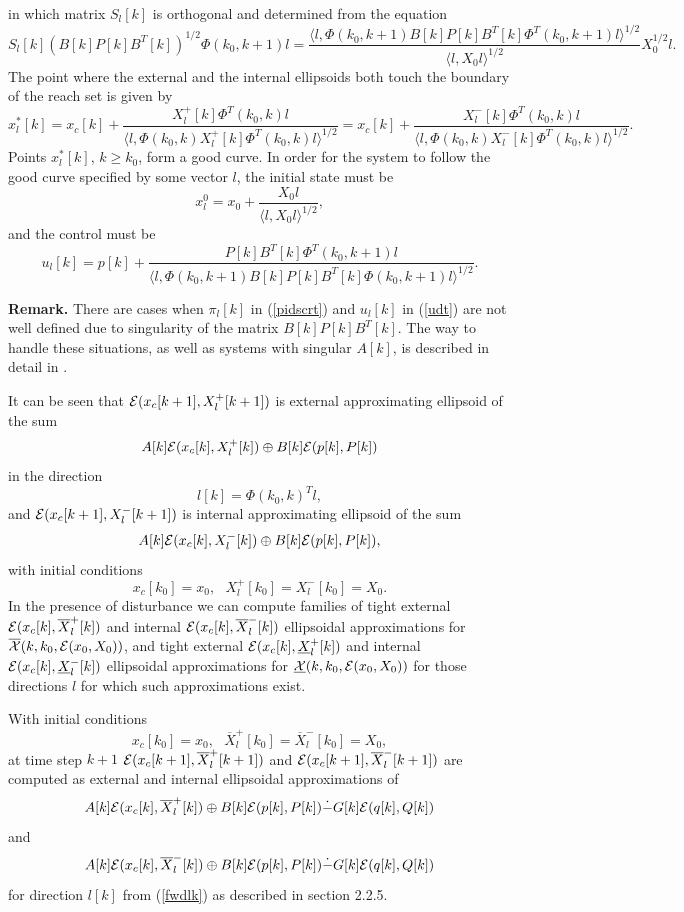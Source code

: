 \documentclass{report}
\newcommand{\EE}{{\cal E}}
\newcommand{\XX}{{\cal X}}
\begin{document}
in which matrix $S_l[k]$ is orthogonal and determined from the equation
\[ S_l[k](B[k]P[k]B^T[k])^{1/2}\Phi(k_0,k+1)l = \frac{\langle l,
\Phi(k_0,k+1)B[k]P[k]B^T[k]\Phi^T(k_0,k+1)l\rangle^{1/2}}{\langle l,
X_0l\rangle^{1/2}}X_0^{1/2}l. \]
The point where  the external and the internal ellipsoids both touch
the boundary of the reach set is given by
\[ x_l^*[k] = x_c[k] + \frac{X^+_l[k]\Phi^T(k_0,k)l}{\langle l,
\Phi(k_0,k)X^+_l[k]\Phi^T(k_0,k)l\rangle^{1/2}} =
x_c[k] + \frac{X^-_l[k]\Phi^T(k_0,k)l}{\langle l,
\Phi(k_0,k)X^-_l[k]\Phi^T(k_0,k)l\rangle^{1/2}}. \]
Points $x^*_l[k]$, $k\geq k_0$, form a good curve. In order for the system
to follow the good curve specified by some vector $l$, the initial
state must be
\begin{equation}
x_l^0 = x_0 + \frac{X_0l}{\langle l, X_0l\rangle^{1/2}}, \label{dx0l}
\end{equation}
and the control must be
\begin{equation}
u_l[k] = p[k] + \frac{P[k]B^T[k]\Phi^T(k_0,k+1)l}{\langle l,
\Phi(k_0,k+1)B[k]P[k]B^T[k]\Phi(k_0,k+1)l\rangle^{1/2}}. \label{udt}
\end{equation}

{\bf Remark.} There are cases when $\pi_l[k]$ in (\ref{pidscrt}) and
$u_l[k]$ in (\ref{udt}) are not well defined due to singularity of the matrix
$B[k]P[k]B^T[k]$. The way to handle these situations, as well as systems
with singular $A[k]$, is described in detail in \cite{pvak}.

It can be seen that
$\EE(x_c[k+1],X_l^+[k+1])$ is external approximating ellipsoid of the sum
\[ A[k]\EE(x_c[k],X_l^+[k]) \oplus B[k]\EE(p[k],P[k]) \]
in the direction
\begin{equation}
l[k] = \Phi(k_0,k)^Tl, \label{fwdlk}
\end{equation}
and $\EE(x_c[k+1],X_l^-[k+1])$ is internal approximating ellipsoid of the sum
\[ A[k]\EE(x_c[k],X_l^-[k]) \oplus B[k]\EE(p[k],P[k]), \]
with initial conditions
\[ x_c[k_0] = x_0, ~~~ X_l^+[k_0] = X_l^-[k_0] = X_0 .\]
In the presence of disturbance we can compute families of tight external
$\EE(x_c[k],\overline{X}_l^+[k])$ and internal
$\EE(x_c[k],\overline{X}_l^-[k])$ ellipsoidal approximations for
$\overline{\XX}(k,k_0,\EE(x_0,X_0))$, and tight external
$\EE(x_c[k],\underline{X}_l^+[k])$ and internal
$\EE(x_c[k],\underline{X}_l^-[k])$ ellipsoidal approximations for
$\underline{\XX}(k,k_0,\EE(x_0,X_0))$ for those directions $l$ for which
such approximations exist.

With initial conditions
\[ x_c[k_0]=x_0, ~~~ \overline{X}_l^+[k_0] = \overline{X}_l^-[k_0] = X_0, \]
at time step $k+1$
$\EE(x_c[k+1],\overline{X}_l^+[k+1])$ and $\EE(x_c[k+1],\overline{X}_l^-[k+1])$
are computed as external and internal ellipsoidal approximations of
\[ A[k]\EE(x_c[k],\overline{X}_l^+[k]) \oplus
B[k]\EE(p[k],P[k]) \dot{-} G[k]\EE(q[k],Q[k]) \]
and
\[ A[k]\EE(x_c[k],\overline{X}_l^-[k]) \oplus
B[k]\EE(p[k],P[k]) \dot{-} G[k]\EE(q[k],Q[k]) \]
for direction $l[k]$ from (\ref{fwdlk}) as described in section 2.2.5.
\end{document}
